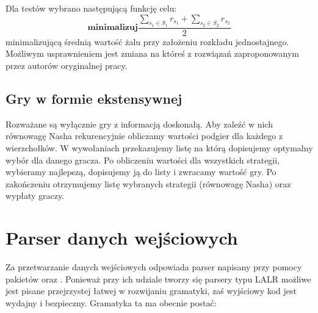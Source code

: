 \documentclass[polish]{standalone}
\begin{document}
Dla testów wybrano następującą funkcję celu:
$$\textbf{minimalizuj} \frac{\sum_{s_1 \in S_1} r_{s_1} + \sum_{s_2 \in S_2} r_{s_2}}{2}$$
minimalizującą średnią wartość żalu przy założeniu rozkładu jednostajnego. Możliwym usprawnieniem jest zmiana na któreś
z rozwiązań zaproponowanym przez autorów oryginalnej pracy.

\subsection{Gry w formie ekstensywnej}

Rozważane są wyłącznie gry z informacją doskonałą. Aby zaleźć w nich równowagę Nasha rekurencyjnie obliczamy wartości
podgier dla każdego z wierzchołków. W wywołaniach przekazujemy listę na którą dopisujemy optymalny wybór dla danego
gracza. Po obliczeniu wartości dla wszystkich strategii, wybieramy najlepszą, dopisujemy ją do listy i zwracamy wartość
gry. Po zakończeniu otrzymujemy listę wybranych strategii (równowagę Nasha) oraz wypłaty graczy.

\section{Parser danych wejściowych}

Za przetwarzanie danych wejściowych odpowiada parser napisany przy pomocy pakietów  oraz . Ponieważ
przy ich udziale tworzy się parsery typu LALR możliwe jest pisane przejrzystej łatwej w rozwijaniu gramatyki, zaś 
wyjściowy kod jest wydajny i bezpieczny. Gramatyka ta ma obecnie postać:
\end{document}
